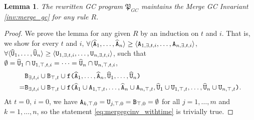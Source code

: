 \documentclass{article}
\numberwithin{equation}{section}
\newtheorem{lemma}[theorem]{Lemma}
\renewcommand{\tt}[1]{\ifmmode\text{\texttt{#1}}\else\texttt{#1}\fi}
\begin{document}
\begin{lemma}
\label{lem:merge_gc_inv}
The rewritten GC program $\mathfrak{P}_{GC}$ maintains the Merge GC Invariant \ref{inv:merge_gc} for any rule $R$.
\end{lemma}
\begin{proof}
We prove the lemma for any given $R$ by an induction on $t$ and $i$.
That is, we show for every $t$ and $i$,
$\forall \langle \widehat{\tt{A}}_1, \dots, \widehat{\tt{A}}_n\rangle \geq \langle \tt{A}_{1,\exists,t,i},\dots,\tt{A}_{n,\exists,t,i} \rangle$,
$\forall \langle \widehat{\tt{U}}_1, \dots, \widehat{\tt{U}}_n\rangle \geq \langle \tt{U}_{1,\exists,t,i},\dots,\tt{U}_{n,\exists,t,i} \rangle$,
such that
$\emptyset = \widehat{\tt{U}}_1 \cap \tt{U}_{1,\top,t,i} = \dots =  \widehat{\tt{U}}_n \cap \tt{U}_{n,\top,t,i}$,
\begin{align}
&
\tt{B}_{\exists,t,i} \cup \tt{B}_{\top,t}
\cup
\tt{f(}
	\widehat{\tt{A}}_1,
    \dots,
    \widehat{\tt{A}}_n,
	\widehat{\tt{U}}_1,
    \dots,
    \widehat{\tt{U}}_n
\tt{)}
\nonumber\\
=&
\tt{B}_{\exists,t,i} \cup \tt{B}_{\top,t}
\cup
\tt{f(}
  \widehat{\tt{A}}_1 \cup \tt{A}_{1,\top,t},
  \dots,
  \widehat{\tt{A}}_n \cup \tt{A}_{n,\top,t},
  \widehat{\tt{U}}_1 \cup \tt{U}_{1,\top,t},
  \dots,
  \widehat{\tt{U}}_n \cup \tt{U}_{n,\top,t}
\tt{)}. \label{eq:mergegcinv_withtime}
\end{align}
At $t=0$, $i=0$, we have $\tt{A}_{k,\top,0} = \tt{U}_{j,\top,0} = \tt{B}_{\top,0} = \emptyset$ for all $j=1,\dots,m$ and $k=1,\dots,n$, so the statement \eqref{eq:mergegcinv_withtime} is trivially true.


\end{proof}
\end{document}
